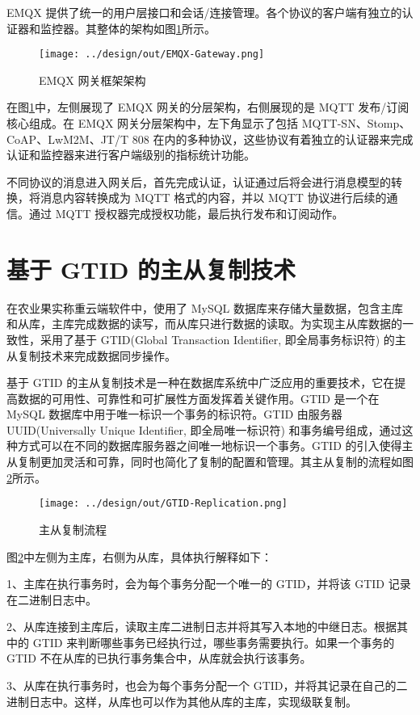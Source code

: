 EMQX 提供了统一的用户层接口和会话/连接管理。各个协议的客户端有独立的认证器和监控器\cite{EMQX-Gateway}。其整体的架构如图\ref{fig:EMQX-Gateway}所示。

\begin{figure}[H]
    \centering
    \texttt{[image: ../design/out/EMQX-Gateway.png]}
    \caption{EMQX 网关框架架构}
    \label{fig:EMQX-Gateway}
\end{figure}

在图\ref{fig:EMQX-Gateway}中，左侧展现了 EMQX 网关的分层架构，右侧展现的是 MQTT 发布/订阅核心组成。在 EMQX 网关分层架构中，左下角显示了包括 MQTT-SN、Stomp、CoAP、LwM2M、JT/T 808 在内的多种协议，这些协议有着独立的认证器来完成认证和监控器来进行客户端级别的指标统计功能。

不同协议的消息进入网关后，首先完成认证，认证通过后将会进行消息模型的转换，将消息内容转换成为 MQTT 格式的内容，并以 MQTT 协议进行后续的通信。通过 MQTT 授权器完成授权功能，最后执行发布和订阅动作。

\section{基于 GTID 的主从复制技术}

在农业果实称重云端软件中，使用了 MySQL 数据库来存储大量数据，包含主库和从库，主库完成数据的读写，而从库只进行数据的读取。为实现主从库数据的一致性，采用了基于 GTID(Global Transaction Identifier, 即全局事务标识符) 的主从复制技术来完成数据同步操作。

基于 GTID 的主从复制技术是一种在数据库系统中广泛应用的重要技术，它在提高数据的可用性、可靠性和可扩展性方面发挥着关键作用。GTID 是一个在 MySQL 数据库中用于唯一标识一个事务的标识符。GTID 由服务器 UUID(Universally Unique Identifier, 即全局唯一标识符) 和事务编号组成，通过这种方式可以在不同的数据库服务器之间唯一地标识一个事务。GTID 的引入使得主从复制更加灵活和可靠，同时也简化了复制的配置和管理。其主从复制的流程如图\ref{fig:GTID-Replication}所示。

\begin{figure}[H]
    \centering
    \texttt{[image: ../design/out/GTID-Replication.png]}
    \caption{主从复制流程}
    \label{fig:GTID-Replication}
\end{figure}

图\ref{fig:GTID-Replication}中左侧为主库，右侧为从库，具体执行解释如下：

1、主库在执行事务时，会为每个事务分配一个唯一的 GTID，并将该 GTID 记录在二进制日志中。

2、从库连接到主库后，读取主库二进制日志并将其写入本地的中继日志。根据其中的 GTID 来判断哪些事务已经执行过，哪些事务需要执行。如果一个事务的 GTID 不在从库的已执行事务集合中，从库就会执行该事务。

3、从库在执行事务时，也会为每个事务分配一个 GTID，并将其记录在自己的二进制日志中。这样，从库也可以作为其他从库的主库，实现级联复制\cite{MySQL-Liu2022}。

